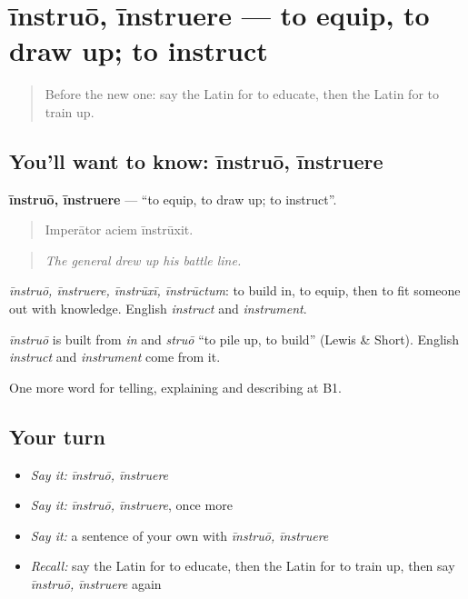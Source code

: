 \section[īnstruō, īnstruere]{īnstruō, īnstruere — to equip, to draw up; to instruct}

\label{lesson:LA-C400-instruo}



\begin{quote}
Before the new one: say the Latin for to educate, then the Latin for to train up.
\end{quote}

\subsection*{You'll want to know: īnstruō, īnstruere}
\textbf{īnstruō, īnstruere} — \textquotedblleft{}to equip, to draw up; to instruct\textquotedblright{}.

\begin{quote}
Imperātor aciem īnstrūxit.
\end{quote}

\begin{quote}
\emph{The general drew up his battle line.}
\end{quote}

\emph{īnstruō, īnstruere, īnstrūxī, īnstrūctum}: to build in, to equip, then to fit someone out with knowledge. English \emph{instruct} and \emph{instrument}.

\begin{cousinweb}
\emph{īnstruō} is built from \emph{in} and \emph{struō} \textquotedblleft{}to pile up, to build\textquotedblright{} (Lewis \& Short). English \emph{instruct} and \emph{instrument} come from it.
\end{cousinweb}

\begin{grammarlens}[title={What you've built}]
One more word for telling, explaining and describing at B1.
\end{grammarlens}

\subsection*{Your turn}
\begin{itemize}
\raggedright
  \item \emph{Say it:} \emph{īnstruō, īnstruere}
  \item \emph{Say it:} \emph{īnstruō, īnstruere}, once more
  \item \emph{Say it:} a sentence of your own with \emph{īnstruō, īnstruere}
  \item \emph{Recall:} say the Latin for to educate, then the Latin for to train up, then say \emph{īnstruō, īnstruere} again
\end{itemize}

